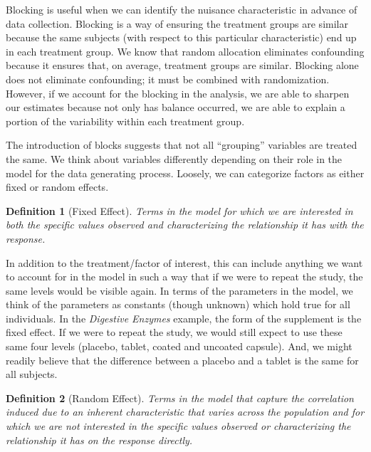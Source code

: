 \documentclass[
]{book}
\theoremstyle{plain}
\theoremstyle{mydefn}
\newtheorem{definition}{Definition}[chapter]
\theoremstyle{myexmpl}
\theoremstyle{remark}
\begin{document}
Blocking is useful when we can identify the nuisance characteristic in advance of data collection. Blocking is a way of ensuring the treatment groups are similar because the same subjects (with respect to this particular characteristic) end up in each treatment group. We know that random allocation eliminates confounding because it ensures that, on average, treatment groups are similar. Blocking alone does not eliminate confounding; it must be combined with randomization. However, if we account for the blocking in the analysis, we are able to sharpen our estimates because not only has balance occurred, we are able to explain a portion of the variability within each treatment group.

The introduction of blocks suggests that not all ``grouping'' variables are treated the same. We think about variables differently depending on their role in the model for the data generating process. Loosely, we can categorize factors as either fixed or random effects.

\begin{definition}[Fixed Effect]
\protect\hypertarget{def:defn-fixed-effect}{}{\label{def:defn-fixed-effect} {} }Terms in the model for which we are interested in both the specific values observed and characterizing the relationship it has with the response.
\end{definition}

In addition to the treatment/factor of interest, this can include anything we want to account for in the model in such a way that if we were to repeat the study, the same levels would be visible again. In terms of the parameters in the model, we think of the parameters as constants (though unknown) which hold true for all individuals. In the \emph{Digestive Enzymes} example, the form of the supplement is the fixed effect. If we were to repeat the study, we would still expect to use these same four levels (placebo, tablet, coated and uncoated capsule). And, we might readily believe that the difference between a placebo and a tablet is the same for all subjects.

\begin{definition}[Random Effect]
\protect\hypertarget{def:defn-random-effect}{}{\label{def:defn-random-effect} {} }Terms in the model that capture the correlation induced due to an inherent characteristic that varies across the population and for which we are \emph{not} interested in the specific values observed or characterizing the relationship it has on the response directly.
\end{definition}
\end{document}
